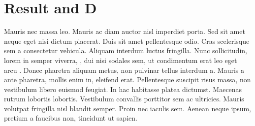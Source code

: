 \section {Result and D}
Mauris nec massa leo. Mauris ac diam auctor nisl imperdiet porta. Sed sit amet neque eget nisi dictum placerat. Duis sit amet pellentesque odio. Cras scelerisque sem a consectetur vehicula. Aliquam interdum luctus fringilla. Nunc sollicitudin, lorem in semper viverra, \citet{Goldreich_1990}, dui nisi sodales sem, ut condimentum erat leo eget arcu \citep{Goldreich_1990,Kumar_1994,Raman2007}. Donec pharetra aliquam metus, non pulvinar tellus interdum a. Mauris a ante pharetra, mollis enim in, eleifend erat. Pellentesque suscipit risus massa, non vestibulum libero euismod feugiat. In hac habitasse platea dictumst. Maecenas rutrum lobortis lobortis. Vestibulum convallis porttitor sem ac ultricies. Mauris volutpat fringilla nisl blandit semper. Proin nec iaculis sem. Aenean neque ipsum, pretium a faucibus non, tincidunt ut sapien.
